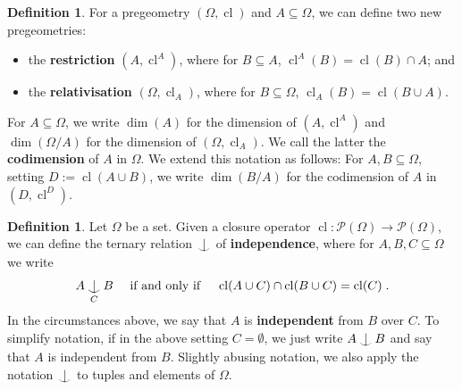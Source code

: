 \documentclass{article}
\theoremstyle{remark}
\theoremstyle{definition}
\newtheorem{definition}[theorem]{Definition}
\newcommand{\remmic}[1]{\textcolor{orange}{MP: #1}}
\newcommand{\repau}[1]{\textcolor{ForestGreen}{PM: #1}}
\DeclareMathOperator{\cl}{cl}
\DeclareMathOperator{\acl}{acl}
\def\Ind#1#2{#1\setbox0=\hbox{$#1x$}\kern\wd0\hbox to 0pt{\hss$#1\mid$\hss}
	\lower.9\ht0\hbox to 0pt{\hss$#1\smile$\hss}\kern\wd0}
\def\ind{\mathop{\mathpalette\Ind{}}}
\begin{document}
{{\begin{definition} For a pregeometry $(\Omega, \cl)$ and $A\subseteq \Omega$, we can define two new pregeometries:
\begin{itemize}
    \item the \textbf{restriction} $(A, \cl^A)$, where for $B\subseteq A$, $\cl^A(B)=\cl(B)\cap A$; and
    \item the \textbf{relativisation} $(\Omega, \cl_A)$, where for $B\subseteq \Omega$, $\cl_A(B)=\cl(B\cup A)$.
\end{itemize}
For $A\subseteq \Omega$, we write $\dim(A)$ for the dimension of $(A, \cl^A)$ and $\dim(\Omega/A)$ for the dimension of $(\Omega, \cl_A)$. We call the latter the \textbf{codimension} of $A$ in $\Omega$. 
{We extend this notation as follows: For $A,  B\subseteq\Omega$, setting $D:=\cl(A\cup B)$, we write  $\dim(B/A)$ for the codimension of $A$ in $(D,\cl^D)$.}
\end{definition}

\begin{definition} Let $\Omega$ be a set. Given a 
closure operator %
$\cl\colon \mathcal{P}(\Omega)\to\mathcal{P}(\Omega)$, we can define the ternary relation $\ind$ of \textbf{independence}, where for $A, B, C\subseteq \Omega$ we write %
\[A\ind_C B\quad \text{ if and only if }\quad \cl(A\cup C)\cap\cl(B\cup C)=\cl(C)\;.\]
    In the circumstances above, we say that $A$ is \textbf{independent} from $B$ over $C$. To simplify notation, if in the above setting $C=\emptyset$, we just write $A\ind  B$ {and say that $A$ is independent from $B$.} Slightly abusing notation, we also apply the notation $\ind$ to tuples and elements of $\Omega$.
    
\end{definition}

}}
\end{document}

